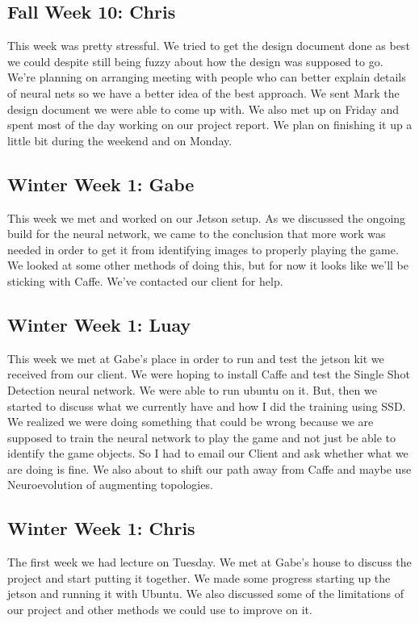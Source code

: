 \documentclass[onecolumn, draftclsnofoot,10pt, compsoc]{IEEEtran}
\begin{document}
\subsection{Fall Week 10: Chris}
This week was pretty stressful. We tried to get the design document done as best we could despite still being fuzzy about how the design was supposed to go. We're planning on arranging meeting with people who can better explain details of neural nets so we have a better idea of the best approach. We sent Mark the design document we were able to come up with. We also met up on Friday and spent most of the day working on our project report. We plan on finishing it up a little bit during the weekend and on Monday.
\subsection{Winter Week 1: Gabe}
This week we met and worked on our Jetson setup. As we discussed the ongoing build for the neural network, we came to the conclusion that more work was needed in order to get it from identifying images to properly playing the game. We looked at some other methods of doing this, but for now it looks like we'll be sticking with Caffe. We've contacted our client for help.
\subsection{Winter Week 1: Luay}
This week we met at Gabe's place in order to run and test the jetson kit we received from our client. We were hoping to install Caffe and test the Single Shot Detection neural network. We were able to run ubuntu on it. But, then we started to discuss what we currently have and how I did the training using SSD. We realized we were doing something that could be wrong because we are supposed to train the neural network to play the game and not just be able to identify the game objects. So I had to email our Client and ask whether what we are doing is fine. We also about to shift our path away from Caffe and maybe use Neuroevolution of augmenting topologies.
\subsection{Winter Week 1: Chris}
The first week we had lecture on Tuesday. We met at Gabe's house to discuss the project and start putting it together. We made some progress starting up the jetson and running it with Ubuntu. We also discussed some of the limitations of our project and other methods we could use to improve on it.
\end{document}
